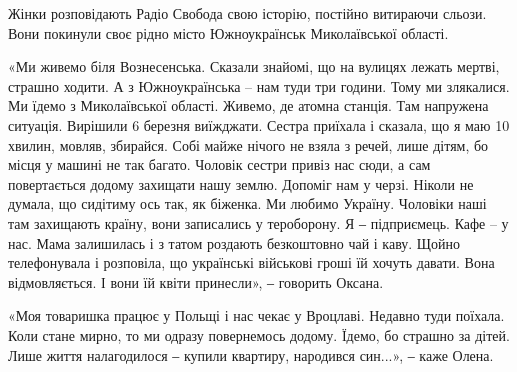Жінки розповідають Радіо Свобода свою історію, постійно витираючи сльози. Вони
покинули своє рідно місто Южноукраїнськ Миколаївської області.

«Ми живемо біля Вознесенська. Сказали знайомі, що на вулицях лежать мертві,
страшно ходити. А з Южноукраїнська – нам туди три години. Тому ми злякалися. Ми
їдемо з Миколаївської області. Живемо, де атомна станція. Там напружена
ситуація. Вирішили 6 березня виїжджати. Сестра приїхала і сказала, що я маю 10
хвилин, мовляв, збирайся. Собі майже нічого не взяла з речей, лише дітям, бо
місця у машині не так багато. Чоловік сестри привіз нас сюди, а сам
повертається додому захищати нашу землю. Допоміг нам у черзі. Ніколи не думала,
що сидітиму ось так, як біженка. Ми любимо Україну. Чоловіки наші там захищають
країну, вони записались у тероборону. Я ‒ підприємець. Кафе – у нас. Мама
залишилась і з татом роздають безкоштовно чай і каву. Щойно телефонувала і
розповіла, що українські військові гроші їй хочуть давати. Вона відмовляється.
І вони їй квіти принесли», ‒ говорить Оксана.

«Моя товаришка працює у Польщі і нас чекає у Вроцлаві. Недавно туди поїхала.
Коли стане мирно, то ми одразу повернемось додому. Їдемо, бо страшно за дітей.
Лише життя налагодилося ‒ купили квартиру, народився син...», ‒ каже Олена.
